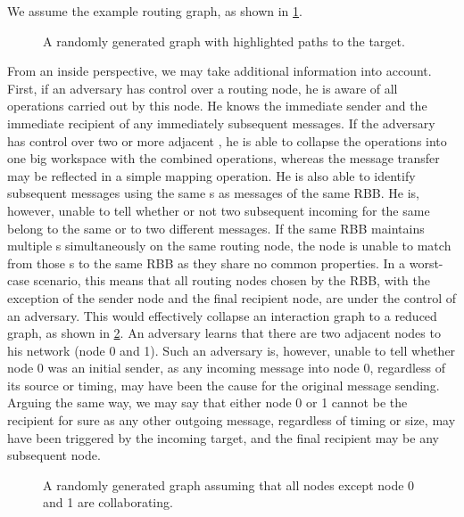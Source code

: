 We assume the example routing graph, as shown in \cref{fig:messageGraphPaths}.

\begin{figure}[!t]\centering
	\resizebox{.9\linewidth}{!}{
		
	}
	\caption{A randomly generated graph with highlighted paths to the target.}
	\label{fig:messageGraphPaths}
\end{figure}


From an inside perspective, we may take additional information into account. First, if an adversary has control over a routing node, he is aware of all operations carried out by this node. He knows the immediate sender and the immediate recipient of any immediately subsequent messages. If the adversary has control over two or more adjacent \VortexNodes{}, he is able to collapse the operations into one big workspace with the combined operations, whereas the message transfer may be reflected in a simple mapping operation. He is also able to identify subsequent messages using the same s as messages of the same RBB. He is, however, unable to tell whether or not two subsequent incoming \VortexMessages{} for the same  belong to the same or to two different messages. If the same RBB maintains multiple s simultaneously on the same routing node, the node is unable to match from those s to the same RBB as they share no common properties. In a worst-case scenario, this means that all routing nodes chosen by the RBB, with the exception of the sender node and the final recipient node,  are under the control of an adversary. This would effectively collapse an interaction graph to a reduced graph, as shown in \cref{fig:reducedMessageGraphPaths}. An adversary learns that there are two adjacent nodes to his network (node 0 and 1). Such an adversary is, however, unable to tell whether node 0 was an initial sender, as any incoming message into node 0, regardless of its source or timing, may have been the cause for the original message sending. Arguing the same way, we may say that either node 0 or 1 cannot be the recipient for sure as any other outgoing message, regardless of timing or size, may have been triggered by the incoming target, and the final recipient may be any subsequent node.

\begin{figure}[!t]\centering
	\resizebox{.9\linewidth}{!}{
		
	}
	\caption{A randomly generated graph assuming that all nodes except node 0 and 1 are collaborating.}
	\label{fig:reducedMessageGraphPaths}
\end{figure}

